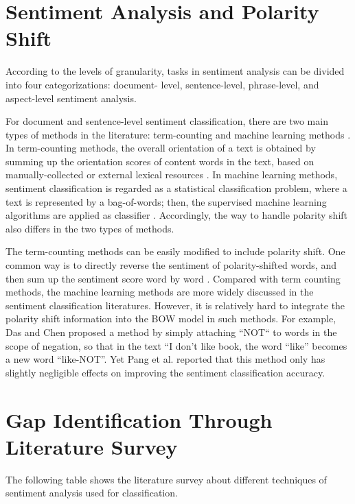 \documentclass[oneside,a4paper,12pt]{pictreport}
\begin{document}
\section{Sentiment Analysis and Polarity Shift}
\hspace{1.1cm}According to the levels of granularity, tasks in sentiment
analysis can be divided into four categorizations: document-
level, sentence-level, phrase-level, and aspect-level sentiment analysis.
\par 
For document and sentence-level sentiment classification, 
there are two main types of methods in the literature:
term-counting and machine learning methods \cite{yahoo} \cite{pang} \cite{pang2008} \cite{ruiEnssemble}. In 
term-counting methods, the overall orientation of a text is
obtained by summing up the orientation scores of content
words in the text, based on manually-collected or external
lexical resources \cite{turney} \cite{turney1}. In machine learning methods,
sentiment classification is regarded as a statistical 
classification problem, where a text is represented by a 
bag-of-words; then, the supervised machine learning algorithms
are applied as classifier \cite{pang}. Accordingly, 
the way to handle polarity shift also differs in the two types of methods.
\par
The term-counting methods can be easily modified to
include polarity shift. One common way is to directly
reverse the sentiment of polarity-shifted words, and then
sum up the sentiment score word by word \cite{valence}. Compared with term counting methods, the machine
learning methods are more widely discussed in the 
sentiment classification literatures. However, it is relatively
hard to integrate the polarity shift information into the
BOW model in such methods. For example, Das and
Chen \cite{yahoo} proposed a method by simply attaching ``NOT``
to words in the scope of negation, so that in the text ``I
don't like book, the word ``like'' becomes a new word ``like-NOT''.
Yet Pang et al. \cite{pang} reported that this method only
has slightly negligible effects on improving the sentiment
classification accuracy.
\newpage




\section{Gap Identification Through Literature Survey}

The following table shows the literature survey about different techniques of sentiment analysis used for classification. 
\end{document}
